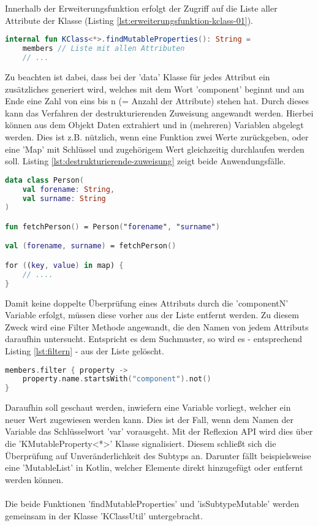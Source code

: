 \\\\
Innerhalb der Erweiterungsfunktion erfolgt der Zugriff auf die Liste aller Attribute der Klasse (Listing
\ref{lst:erweiterungsfunktion-kclass-01}).
\begin{lstlisting}[caption={Erweiterungsfunktion 'KClass' mit Liste aller Attribute}, label={lst:erweiterungsfunktion-kclass-01}, language=Kotlin]
internal fun KClass<*>.findMutableProperties(): String =
	members // Liste mit allen Attributen
	// ...
\end{lstlisting}
\bigskip
Zu beachten ist dabei, dass bei der 'data' Klasse für jedes Attribut ein zusätzliches generiert wird, welches mit dem Wort 'component' beginnt und am Ende eine Zahl von eins bis n (= Anzahl der Attribute) stehen hat. Durch dieses kann das Verfahren der destrukturierenden Zuweisung angewandt werden. Hierbei können aus dem Objekt Daten extrahiert und in (mehreren) Variablen abgelegt werden. Dies ist z.B. nützlich, wenn eine Funktion zwei Werte zurückgeben, oder eine 'Map' mit Schlüssel und zugehörigem Wert gleichzeitig durchlaufen werden soll. Listing
\ref{lst:destrukturierende-zuweisung}
zeigt beide Anwendungsfälle.
\begin{lstlisting}[caption={Destrukturierende Zuweisung}, label={lst:destrukturierende-zuweisung}, language=Kotlin]
data class Person(
	val forename: String,
	val surname: String
)

fun fetchPerson() = Person("forename", "surname")

val (forename, surname) = fetchPerson()

for ((key, value) in map) {
	// .... 
}
\end{lstlisting}
Damit keine doppelte Überprüfung eines Attributs durch die 'componentN' Variable erfolgt, müssen diese vorher aus der Liste entfernt werden. Zu diesem Zweck wird eine Filter Methode angewandt, die den Namen von jedem Attributs daraufhin untersucht. Entspricht es dem Suchmuster, so wird es - entsprechend Listing 
\ref{lst:filtern}
- aus der Liste gelöscht.
\begin{lstlisting}[caption={Filtern}, label={lst:filtern}, language=Kotlin] 
members.filter { property -> 
	property.name.startsWith("component").not() 
}
\end{lstlisting}
\bigskip
Daraufhin soll geschaut werden, inwiefern eine Variable vorliegt, welcher ein neuer Wert zugewiesen werden kann. Dies ist der Fall, wenn dem Namen der Variable das Schlüsselwort 'var' vorausgeht. Mit der Reflexion API wird dies über die 'KMutableProperty<*>' Klasse signalisiert. Diesem schließt sich die Überprüfung auf Unveränderlichkeit des Subtyps an. Darunter fällt beispielsweise eine 'MutableList' in Kotlin, welcher Elemente direkt hinzugefügt oder entfernt werden können.
\\\\
Die beide Funktionen 'findMutableProperties' und 'isSubtypeMutable' werden gemeinsam in der Klasse 'KClassUtil' untergebracht.

